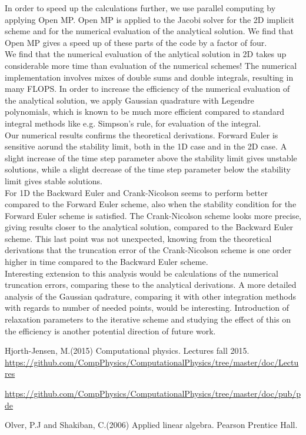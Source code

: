 \documentclass{article}
\begin{document}
In order to speed up the calculations further, we use parallel computing by applying Open MP. Open MP is applied to the Jacobi solver for the 2D implicit scheme and for the numerical evaluation of the analytical solution. We find that Open MP gives a speed up of these parts of the code by a factor of four.\\

We find that the numerical evaluation of the anlytical solution in 2D takes up considerable more time than evaluation of the numerical schemes! The numerical implementation involves mixes of double sums and double integrals, resulting in many FLOPS. In order to increase the efficiency of the numerical evaluation of the analytical solution, we apply Gaussian quadrature with Legendre polynomials, which is known to be much more efficient compared to standard integral methods like e.g. Simpson's rule, for evaluation of the integral. \\

Our numerical results confirms the theoretical derivations. Forward Euler is sensitive aorund the stability limit, both in the 1D case and in the 2D case. A slight increase of the time step parameter above the stability limit gives unstable solutions, while a slight decrease of the time step parameter below the stability limit gives stable solutions.\\

For 1D the Backward Euler and Crank-Nicolson seems to perform better compared to the Forward Euler scheme, also when the stability condition for the Forward Euler scheme is satisfied. The Crank-Nicolson scheme looks more precise, giving results closer to the analytical solution, compared to the Backward Euler scheme. This last point was not unexpected, knowing from the theoretical derivations that the truncation error of the Crank-Nicolson scheme is one order higher in time compared to the Backward Euler scheme.\\

Interesting extension to this analysis would be calculations of the numerical truncation errors, comparing these to the analytical derivations. A more detailed analysis of the Gaussian qadrature, comparing it with other integration methods with regards to number of needed points, would be interesting. Introduction of relaxation parameters to the iterative scheme and studying the effect of this on the efficiency is another potential direction of future work.



\begin{thebibliography}{9}
	Hjorth-Jensen, M.(2015)
	Computational physics. Lectures fall 2015. 
	\url{https://github.com/CompPhysics/ComputationalPhysics/tree/master/doc/Lectures}
	
	\url{https://github.com/CompPhysics/ComputationalPhysics/tree/master/doc/pub/pde}
	
	Olver, P.J and Shakiban, C.(2006)
	Applied linear algebra. Pearson Prentice Hall. 

\end{thebibliography}
\end{document}
